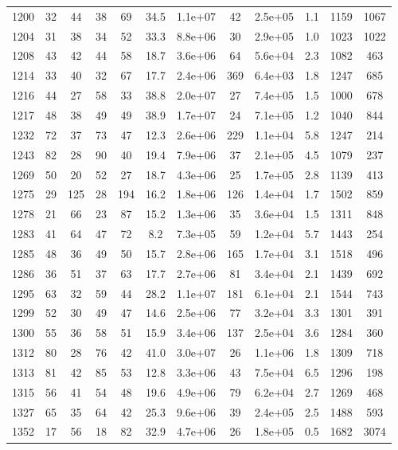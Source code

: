 \begin{table}
\begin{tabular}{cccccccccccc}
1200 & 32 & 44 & 38 & 69 & 34.5 & 1.1e+07 & 42 & 2.5e+05 & 1.1 & 1159 & 1067 \\
1204 & 31 & 38 & 34 & 52 & 33.3 & 8.8e+06 & 30 & 2.9e+05 & 1.0 & 1023 & 1022 \\
1208 & 43 & 42 & 44 & 58 & 18.7 & 3.6e+06 & 64 & 5.6e+04 & 2.3 & 1082 & 463 \\
1214 & 33 & 40 & 32 & 67 & 17.7 & 2.4e+06 & 369 & 6.4e+03 & 1.8 & 1247 & 685 \\
1216 & 44 & 27 & 58 & 33 & 38.8 & 2.0e+07 & 27 & 7.4e+05 & 1.5 & 1000 & 678 \\
1217 & 48 & 38 & 49 & 49 & 38.9 & 1.7e+07 & 24 & 7.1e+05 & 1.2 & 1040 & 844 \\
1232 & 72 & 37 & 73 & 47 & 12.3 & 2.6e+06 & 229 & 1.1e+04 & 5.8 & 1247 & 214 \\
1243 & 82 & 28 & 90 & 40 & 19.4 & 7.9e+06 & 37 & 2.1e+05 & 4.5 & 1079 & 237 \\
1269 & 50 & 20 & 52 & 27 & 18.7 & 4.3e+06 & 25 & 1.7e+05 & 2.8 & 1139 & 413 \\
1275 & 29 & 125 & 28 & 194 & 16.2 & 1.8e+06 & 126 & 1.4e+04 & 1.7 & 1502 & 859 \\
1278 & 21 & 66 & 23 & 87 & 15.2 & 1.3e+06 & 35 & 3.6e+04 & 1.5 & 1311 & 848 \\
1283 & 41 & 64 & 47 & 72 & 8.2 & 7.3e+05 & 59 & 1.2e+04 & 5.7 & 1443 & 254 \\
1285 & 48 & 36 & 49 & 50 & 15.7 & 2.8e+06 & 165 & 1.7e+04 & 3.1 & 1518 & 496 \\
1286 & 36 & 51 & 37 & 63 & 17.7 & 2.7e+06 & 81 & 3.4e+04 & 2.1 & 1439 & 692 \\
1295 & 63 & 32 & 59 & 44 & 28.2 & 1.1e+07 & 181 & 6.1e+04 & 2.1 & 1544 & 743 \\
1299 & 52 & 30 & 49 & 47 & 14.6 & 2.5e+06 & 77 & 3.2e+04 & 3.3 & 1301 & 391 \\
1300 & 55 & 36 & 58 & 51 & 15.9 & 3.4e+06 & 137 & 2.5e+04 & 3.6 & 1284 & 360 \\
1312 & 80 & 28 & 76 & 42 & 41.0 & 3.0e+07 & 26 & 1.1e+06 & 1.8 & 1309 & 718 \\
1313 & 81 & 42 & 85 & 53 & 12.8 & 3.3e+06 & 43 & 7.5e+04 & 6.5 & 1296 & 198 \\
1315 & 56 & 41 & 54 & 48 & 19.6 & 4.9e+06 & 79 & 6.2e+04 & 2.7 & 1269 & 468 \\
1327 & 65 & 35 & 64 & 42 & 25.3 & 9.6e+06 & 39 & 2.4e+05 & 2.5 & 1488 & 593 \\
1352 & 17 & 56 & 18 & 82 & 32.9 & 4.7e+06 & 26 & 1.8e+05 & 0.5 & 1682 & 3074 \\

\end{tabular}
\end{table}
